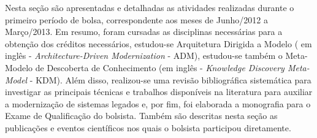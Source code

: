 Nesta seção são apresentadas e detalhadas as atividades realizadas durante o primeiro período de bolsa,  
 correspondente aos meses de Junho/2012 a Março/2013.
 Em resumo, foram cursadas as disciplinas necessárias  para a obtenção dos créditos necessários, estudou-se Arquitetura Dirigida a Modelo
  ( em inglês - \textit{Architecture-Driven Modernization} - ADM), estudou-se também o Meta-Modelo de Descoberta de Conhecimento (em inglês - \textit{Knowledge Discovery Meta-Model} - KDM). 
Além disso, realizou-se uma revisão bibliográfica sistemática para investigar as principais técnicas e trabalhos disponíveis na literatura para auxiliar a modernização de sistemas legados e, por fim, foi elaborada a monografia para o Exame de Qualificação do bolsista. Também são descritas nesta seção as publicações e eventos científicos nos quais o bolsista participou diretamente.